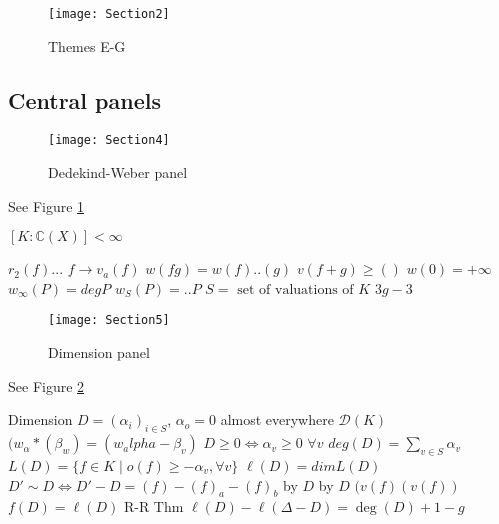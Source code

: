 \documentclass{article}
\begin{document}
\begin{figure}[ht]
\caption{Themes E-G}
\centering
\texttt{[image: Section2]}
\end{figure}


\subsection{Central panels}

\begin{figure}[ht]
\caption{Dedekind-Weber panel}
\label{fig:section4}
\centering
\texttt{[image: Section4]}
\end{figure}
See Figure \ref{fig:section4}


$[K: \mathbb C(X)] < \infty$

$r_2(f)...$  $f\to v_a(f)$
$w(fg)=w(f)..(g)$
$v(f+g)\geq ()$
$w(0)=+\infty$
$w_\infty(P)=deg P$
$w_S(P)=..P$
$S=\text{ set of valuations of $K$}$
$3g-3$

\pagebreak
\begin{figure}[ht]
\caption{Dimension panel}
\label{fig:section5}
\centering
\texttt{[image: Section5]}
\end{figure}
See Figure \ref{fig:section5}



Dimension  $D=(\alpha_i)_{i\in S}$, $\alpha_o = 0$ almost everywhere
$\mathcal{D}(K)$ $(w_\alpha\ast(\beta_w)=(w_alpha-\beta_v)$
$D\geq 0 \iff \alpha _v\geq 0$ $\forall v$
$deg(D)=\sum_{v\in S}\alpha_v$
$L(D)=\{f\in K\mid o(f)\geq -\alpha_v, \forall v\}$
$\ell(D)=dim L(D)$
$D'\sim D\iff D'-D=(f)-(f)_a-(f)_b$
by $D$ by $D$ $(v(f)(v(f))$
$f(D) =\ell(D)$
R-R Thm %
$\ell(D)-\ell(\Delta-D)=\deg(D)+1 - g$
\end{document}
